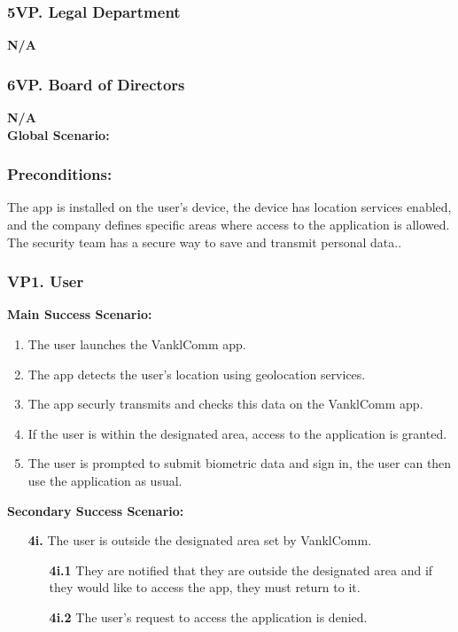 \documentclass[]{article}
\begin{document}
\subsubsection*{5VP. Legal Department}
\textbf{N/A}
\subsubsection*{6VP. Board of Directors}
\textbf{N/A}\\

\noindent \textbf{Global Scenario:}
\subsubsection*{Preconditions:} The app is installed on the user's device, the device has location services enabled, and the company defines specific areas where access to the application is allowed. The security team has a secure way to save and transmit personal data..
\subsubsection*{VP1. User}
\textbf{Main Success Scenario:}
\begin{enumerate}
	\item The user launches the VanklComm app.
	\item The app detects the user's location using geolocation services.
	\item The app securly transmits and checks this data on the VanklComm app.
	\item If the user is within the designated area, access to the application is granted.
	\item The user is prompted to submit biometric data and sign in, the user can then use the application as usual.
\end{enumerate}
\textbf{Secondary Success Scenario:}
\begin{enumerate}
	\item[\textbf{4i.}] The user is outside the designated area set by VanklComm.
		\begin{enumerate}
			\item[\textbf{4i.1}] They are notified that they are outside the designated area and if they would like to access the app, they must return to it.
			\item[\textbf{4i.2}] The user's request to access the application is denied.
		\end{enumerate}
\end{enumerate}
\end{document}
